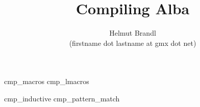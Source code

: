 \documentclass[12pt]{article}
\begin{document}


\title{
    Compiling Alba
}

\author{
    Helmut Brandl
    \\
    \scriptsize (firstname dot lastname at gmx dot net)
}
\date{}

\maketitle




\tableofcontents

 {cmp_macros}
 {cmp_lmacros}


 {cmp_inductive}
 {cmp_pattern_match}
\end{document}
